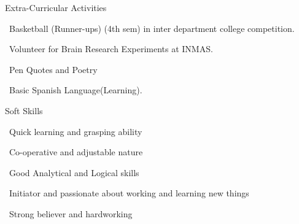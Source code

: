 \documentclass{resume} %
\begin{document}
\begin{rSection}{Extra-Curricular Activities} \itemsep -3pt
	\item \textbullet \ Basketball (Runner-ups) (4th sem) in inter department college competition.
	\item \textbullet \ Volunteer for Brain Research Experiments at INMAS.
	\item \textbullet \ Pen Quotes and Poetry
	\item \textbullet \ Basic Spanish Language(Learning).
\end{rSection}

\begin{rSection}{Soft Skills}
  \itemsep -3pt
 \item \textbullet \ Quick learning and grasping ability
 \item \textbullet \ Co-operative and adjustable nature
 \item \textbullet \ Good Analytical and Logical skills 
 \item \textbullet \ Initiator and passionate about working and learning new things 
 \item \textbullet \ Strong believer and hardworking
\end{rSection}
\end{document}
